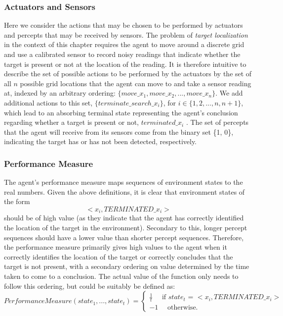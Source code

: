 \subsubsection{Actuators and Sensors}
Here we consider the actions that may be chosen to be performed by actuators and percepts that may be received by sensors. The problem of \textit{target localization} in the context of this chapter requires the agent to move around a discrete grid and use a calibrated sensor to record noisy readings that indicate whether the target is present or not at the location of the reading. It is therefore intuitive to describe the set of possible actions to be performed by the actuators by the set of all $n$ possible grid locations that the agent can move to and take a sensor reading at, indexed by an arbitrary ordering: $\{move\_x_1, move\_x_2, ..., move\_x_n\}$. We add additional actions to this set, $\{terminate\_search\_x_{i}\}$, for $i \in \{1, 2, ..., n, n+1\}$, which lead to an absorbing terminal state representing the agent's conclusion regarding whether a target is present or not, $terminated\_x_{i}$ . The set of percepts that the agent will receive from its sensors come from the binary set \{1, 0\}, indicating the target has or has not been detected, respectively.



\subsubsection{Performance Measure}\label{sssection:PerfMeas}
The agent's performance measure maps sequences of environment states to the real numbers. Given the above definitions, it is clear that environment states of the form
\[ <x_i, TERMINATED\_x_i> \]
should be of high value (as they indicate that the agent has correctly identified the location of the target in the environment). Secondary to this, longer percept sequences should have a lower value than shorter percept sequences. Therefore, the performance measure primarily gives high values to the agent when it correctly identifies the location of the target or correctly concludes that the target is not present, with a secondary ordering on value determined by the time taken to come to a conclusion. The actual value of the function only needs to follow this ordering, but could be suitably be defined as:
\[
Performance Measure(state_1,..., state_t) = 
\begin{cases}
\frac{1}{t} \quad \text{ if } state_t \text{ = } <x_i, TERMINATED\_x_i>
\\
-1 \quad \text { otherwise. }
\end{cases}
\]

